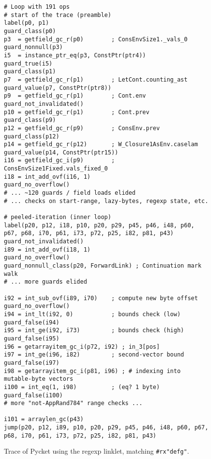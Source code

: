 \begin{figure}[!htbp]
	\centering

	\begin{minipage}{1\textwidth}
\begin{lstlisting}[language=rptrace,basicstyle=\ttfamily\scriptsize]
# Loop with 191 ops
# start of the trace (preamble)
label(p0, p1)
guard_class(p0)
p3  = getfield_gc_r(p0)        ; ConsEnvSize1._vals_0
guard_nonnull(p3)
i5  = instance_ptr_eq(p3, ConstPtr(ptr4))
guard_true(i5)
guard_class(p1)
p7  = getfield_gc_r(p1)        ; LetCont.counting_ast
guard_value(p7, ConstPtr(ptr8))
p9  = getfield_gc_r(p1)        ; Cont.env
guard_not_invalidated()
p10 = getfield_gc_r(p1)        ; Cont.prev
guard_class(p9)
p12 = getfield_gc_r(p9)        ; ConsEnv.prev
guard_class(p12)
p14 = getfield_gc_r(p12)       ; W_Closure1AsEnv.caselam
guard_value(p14, ConstPtr(ptr15))
i16 = getfield_gc_i(p9)        ; ConsEnvSize1Fixed.vals_fixed_0
i18 = int_add_ovf(i16, 1)
guard_no_overflow()
# ... ~120 guards / field loads elided
# ... checks on start-range, lazy-bytes, regexp state, etc.

# peeled-iteration (inner loop)
label(p20, p12, i18, p10, p20, p29, p45, p46, i48, p60, p67, p68, i70, p61, i73, p72, p25, i82, p81, p43)
guard_not_invalidated()
i89 = int_add_ovf(i18, 1)
guard_no_overflow()
guard_nonnull_class(p20, ForwardLink) ; Continuation mark walk
# ... more guards elided

i92 = int_sub_ovf(i89, i70)    ; compute new byte offset
guard_no_overflow()
i94 = int_lt(i92, 0)           ; bounds check (low)
guard_false(i94)
i95 = int_ge(i92, i73)         ; bounds check (high)
guard_false(i95)
i96 = getarrayitem_gc_i(p72, i92) ; in_3[pos]
i97 = int_ge(i96, i82)         ; second-vector bound
guard_false(i97)
i98 = getarrayitem_gc_i(p81, i96) ; # indexing into mutable-byte vectors
i100 = int_eq(1, i98)          ; (eq? 1 byte)
guard_false(i100)
# more "not-AppRand784" range checks ...

i101 = arraylen_gc(p43)
jump(p20, p12, i89, p10, p20, p29, p45, p46, i48, p60, p67, p68, i70, p61, i73, p72, p25, i82, p81, p43)
\end{lstlisting}

	\end{minipage}
\caption{\small Trace of Pycket using the regexp linklet, matching
		{\tt\#rx"defg"}.}
\label{fig:regexp-linklet-big-trace}
\end{figure}